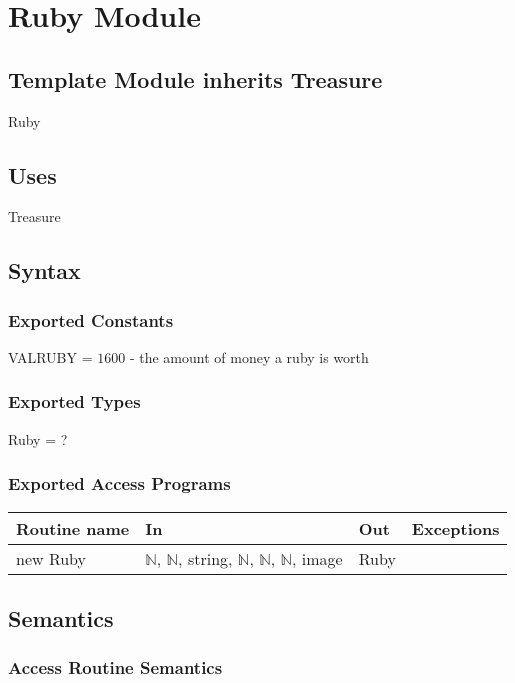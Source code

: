 \documentclass[12pt]{article}
\begin{document}
\newpage

\section*{Ruby Module}

\subsection*{Template Module inherits Treasure}

Ruby

\subsection*{Uses}

Treasure

\subsection*{Syntax}

\subsubsection*{Exported Constants}

VALRUBY = $1600$ - the amount of money a ruby is worth

\subsubsection*{Exported Types}

Ruby = ?

\subsubsection*{Exported Access Programs}

\begin{tabular}{| l | l | l | l |}
\hline
\textbf{Routine name} & \textbf{In} & \textbf{Out} & \textbf{Exceptions}\\
\hline
new Ruby & $\mathbb{N}$, $\mathbb{N}$, string, $\mathbb{N}$, $\mathbb{N}$, $\mathbb{N}$, image & Ruby & ~\\
\hline
\end{tabular}

\subsection*{Semantics}

\subsubsection*{Access Routine Semantics}
\end{document}
